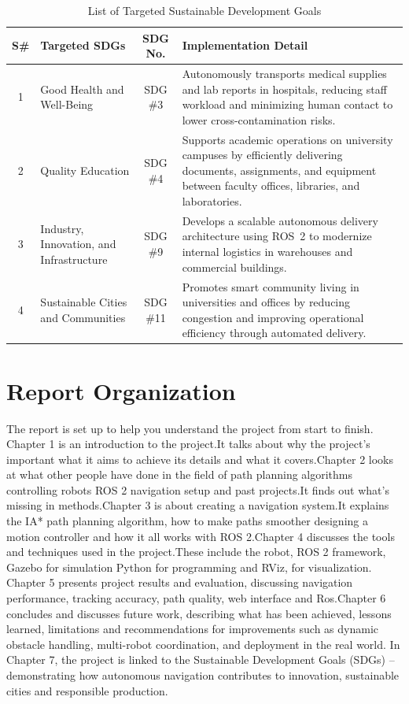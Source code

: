 \begin{table}[h]
\centering
\caption{List of Targeted Sustainable Development Goals}
\label{tab:sdgs}
\renewcommand{\arraystretch}{1.5} %
\begin{tabular}{|c|p{}|c|p{}|}
\hline
\textbf{S\#} & \textbf{Targeted SDGs} & \textbf{SDG No.} & \textbf{Implementation Detail} \\ \hline
1 & Good Health and Well-Being & SDG \#3 & 
Autonomously transports medical supplies and lab reports in hospitals, reducing staff workload and minimizing human contact to lower cross-contamination risks. \\ \hline
2 & Quality Education & SDG \#4 & 
Supports academic operations on university campuses by efficiently delivering documents, assignments, and equipment between faculty offices, libraries, and laboratories. \\ \hline
3 & Industry, Innovation, and Infrastructure & SDG \#9 & 
Develops a scalable autonomous delivery architecture using ROS~2 to modernize internal logistics in warehouses and commercial buildings. \\ \hline
4 & Sustainable Cities and Communities & SDG \#11 & 
Promotes smart community living in universities and offices by reducing congestion and improving operational efficiency through automated delivery. \\ \hline
\end{tabular}
\end{table}\section{Report Organization}
The report is set up to help you understand the project from start to finish. Chapter 1 is an introduction to the project.It talks about why the project's important what it aims to achieve its details and what it covers.Chapter 2 looks at what other people have done in the field of path planning algorithms controlling robots ROS 2 navigation setup and past projects.It finds out what's missing in methods.Chapter 3 is about creating a navigation system.It explains the IA* path planning algorithm, how to make paths smoother designing a motion controller and how it all works with ROS 2.Chapter 4 discusses the tools and techniques used in the project.These include the robot, ROS 2 framework, Gazebo for simulation Python for programming and RViz, for visualization. Chapter 5 presents project results and evaluation, discussing navigation performance, tracking accuracy, path quality, web interface and Ros.Chapter 6 concludes and discusses future work, describing what has been achieved, lessons learned, limitations and recommendations for improvements such as dynamic obstacle handling, multi-robot coordination, and deployment in the real world. In Chapter 7, the project is linked to the Sustainable Development Goals (SDGs) – demonstrating how autonomous navigation contributes to innovation, sustainable cities and responsible production. 

